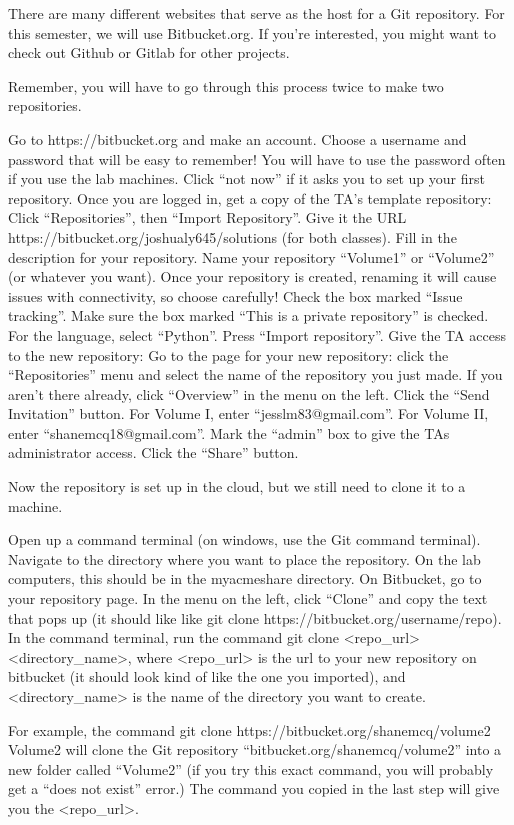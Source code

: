 There are many different websites that serve as the host for a Git repository. For this semester, we will use Bitbucket.org. If you're interested, you might want to check out Github or Gitlab for other projects.

Remember, you will have to go through this process twice to make two repositories.

Go to https://bitbucket.org and make an account. Choose a username and password that will be easy to remember! You will have to use the password often if you use the lab machines.
Click “not now” if it asks you to set up your first repository.
Once you are logged in, get a copy of the TA's template repository:
Click “Repositories”, then “Import Repository”.
Give it the URL https://bitbucket.org/joshualy645/solutions (for both classes).
Fill in the description for your repository.
Name your repository “Volume1” or “Volume2” (or whatever you want).
Once your repository is created, renaming it will cause issues with connectivity, so choose carefully!
Check the box marked “Issue tracking”.
Make sure the box marked “This is a private repository” is checked.
For the language, select “Python”.
Press “Import repository”.
Give the TA access to the new repository:
Go to the page for your new repository: click the “Repositories” menu and select the name of the repository you just made. If you aren't there already, click “Overview” in the menu on the left.
Click the “Send Invitation” button. For Volume I, enter “jesslm83@gmail.com”. For Volume II, enter “shanemcq18@gmail.com”.
Mark the “admin” box to give the TAs administrator access.
Click the “Share” button.

Now the repository is set up in the cloud, but we still need to clone it to a machine.

Open up a command terminal (on windows, use the Git command terminal).
Navigate to the directory where you want to place the repository. On the lab computers, this should be in the myacmeshare directory.
On Bitbucket, go to your repository page. In the menu on the left, click “Clone” and copy the text that pops up (it should like like git clone https://bitbucket.org/username/repo).
In the command terminal, run the command git clone <repo\_url> <directory\_name>, where <repo\_url> is the url to your new repository on bitbucket (it should look kind of like the one you imported), and <directory\_name> is the name of the directory you want to create.

For example, the command
  git clone https://bitbucket.org/shanemcq/volume2 Volume2
will clone the Git repository “bitbucket.org/shanemcq/volume2” into a new folder called “Volume2” (if you try this exact command, you will probably get a “does not exist” error.) The command you copied in the last step will give you the <repo\_url>.

